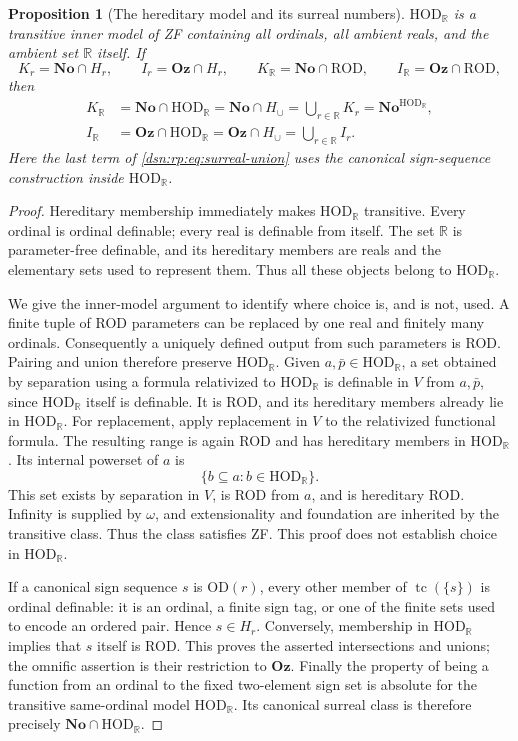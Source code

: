 \documentclass[11pt,a4paper]{article}
\numberwithin{equation}{section}
\newtheorem{proposition}[proposition]{Proposition}
\theoremstyle{definition}
\theoremstyle{remark}
\newcommand{\No}{\mathbf{No}}
\newcommand{\Oz}{\mathbf{Oz}}
\newcommand{\HOD}{\mathrm{HOD}}
\newcommand{\R}{\mathbb R}
\newcommand{\ROD}{\mathrm{ROD}}
\newcommand{\HR}{\HOD_{\R}}
\newcommand{\KR}{K_{\R}}
\newcommand{\IR}{I_{\R}}
\newcommand{\Hcup}{H_{\cup}}
\begin{document}
\begin{proposition}[The hereditary model and its surreal numbers]
\label{dsn:rp:prop:hereditary-model}
$\HR$ is a transitive inner model of ZF containing all ordinals,
all ambient reals, and the ambient set $\mathbb R$ itself.  If
\[
 K_r=\No\cap H_r,\qquad I_r=\Oz\cap H_r,
 \qquad
 \KR=\No\cap\ROD,\qquad
 \IR=\Oz\cap\ROD,
\]
then
\begin{align}
 \KR
   &=\No\cap \HR
     =\No\cap \Hcup
     =\bigcup_{r\in\mathbb R}K_r
     =\No^{\HR},\label{dsn:rp:eq:surreal-union}\\
 \IR
   &=\Oz\cap \HR
     =\Oz\cap \Hcup
     =\bigcup_{r\in\mathbb R}I_r.\label{dsn:rp:eq:integer-union}
\end{align}
Here the last term of \eqref{dsn:rp:eq:surreal-union} uses the canonical
sign-sequence construction inside $\HR$.
\end{proposition}
\begin{proof}
Hereditary membership immediately makes $\HR$ transitive.
Every ordinal is ordinal definable; every real is definable from itself.
The set $\mathbb R$ is parameter-free definable, and its hereditary
members are reals and the elementary sets used to represent them.
Thus all these objects belong to $\HR$.

We give the inner-model argument to identify where choice is, and is
not, used.  A finite tuple of ROD parameters can be replaced by one real
and finitely many ordinals.  Consequently a uniquely defined output
from such parameters is ROD.  Pairing and union therefore preserve
$\HR$.  Given $a,\bar p\in \HR$, a set obtained by
separation using a formula relativized to $\HR$ is definable
in $V$ from $a,\bar p$, since $\HR$ itself is definable.  It is
ROD, and its hereditary members already lie in $\HR$.
For replacement, apply replacement in $V$ to the relativized functional
formula.  The resulting range is again ROD and has hereditary members
in $\HR$.  Its internal powerset of $a$ is
\[
 \{b\subseteq a:b\in \HR\}.
\]
This set exists by separation in $V$, is ROD from $a$, and is hereditary
ROD.  Infinity is supplied by $\omega$, and extensionality and foundation
are inherited by the transitive class.  Thus the class satisfies ZF.
This proof does not establish choice in $\HR$.

If a canonical sign sequence $s$ is OD$(r)$, every other member of
$\operatorname{tc}(\{s\})$ is ordinal definable: it is an ordinal, a
finite sign tag, or one of the finite sets used to encode an ordered
pair.  Hence $s\in H_r$.  Conversely, membership in $\HR$
implies that $s$ itself is ROD.  This proves the asserted intersections
and unions; the omnific assertion is their restriction to
$\Oz$.  Finally the property of being a function from an ordinal
to the fixed two-element sign set is absolute for the transitive
same-ordinal model $\HR$.  Its canonical surreal class is
therefore precisely $\No\cap \HR$.
\end{proof}
\end{document}
